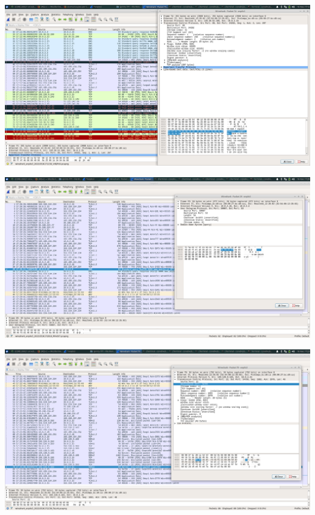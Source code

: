 \documentclass[a4paper]{article}
\begin{document}
\begin{center}
	\includegraphics[scale=0.23]{images/http}
\end{center}

\begin{center}
	\includegraphics[scale=0.23]{images/nslookup}
\end{center}

\begin{center}
	\includegraphics[scale=0.23]{images/ssh}
\end{center}
\end{document}
